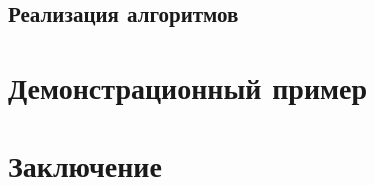 \documentclass[12pt]{diploma}
\begin{document}
	\subsection{Реализация алгоритмов}
	
	
	
	
	
	
	\section{Демонстрационный пример}
	\section{Заключение}
	
	
	
	
	
	\newpage
	
	
	
\end{document}
